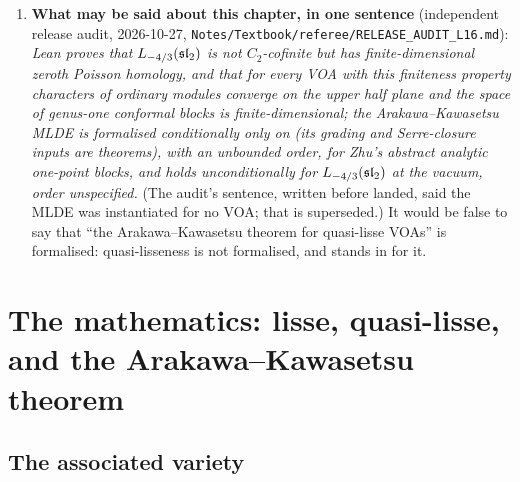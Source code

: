 \begin{enumerate}
\item \textbf{What may be said about this chapter, in one sentence} (independent release audit, 2026-10-27,
  \texttt{Notes/\allowbreak Textbook/\allowbreak referee/\allowbreak RELEASE\_AUDIT\_L16.md}): \emph{Lean proves that
  $L_{-4/3}(\mathfrak{sl}_2)$ is not $C_2$-cofinite but has finite-dimensional zeroth Poisson homology, and that for every
  VOA with this finiteness property characters of ordinary modules converge on the upper half plane and the space of
  genus-one conformal blocks is finite-dimensional; the Arakawa--Kawasetsu MLDE is formalised conditionally only on
   (its grading and Serre-closure inputs are theorems), with an unbounded order, for Zhu's abstract
  analytic one-point blocks, and holds unconditionally for $L_{-4/3}(\mathfrak{sl}_2)$ at the vacuum, order unspecified.}
  (The audit's sentence, written before  landed, said the MLDE was instantiated for no VOA; that is
  superseded.) It would be false to say that ``the Arakawa--Kawasetsu theorem for quasi-lisse VOAs'' is formalised:
  quasi-lisseness is not formalised, and  stands in for it.
\end{enumerate}

\section{The mathematics: lisse, quasi-lisse, and the Arakawa--Kawasetsu theorem}\label{l16:sec:math}

\subsection{The associated variety}

